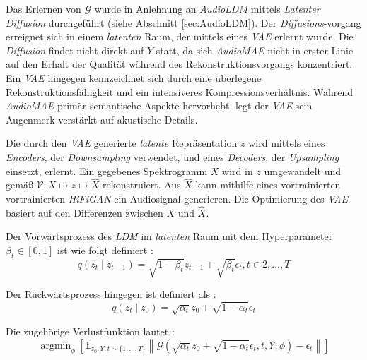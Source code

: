 \documentclass[
  a4paper,  %
  twoside,  %
  bibliography=totoc,
  headsepline,
  cleardoublepage=empty,
  parskip=half,
  draft=false
]{scrbook}
\begin{document}
Das Erlernen von $\mathcal{G}$ wurde in Anlehnung an \emph{AudioLDM} \cite{liu_audioldm_2023} mittels \emph{Latenter Diffusion} \cite{rombach_high-resolution_2022} durchgeführt (siehe Abschnitt \ref{sec:AudioLDM}). Der \emph{Diffusions}-vorgang erreignet sich in einem \emph{latenten} Raum, der mittels eines \emph{VAE} \cite{kingma_auto-encoding_2022} erlernt wurde. Die \emph{Diffusion} findet nicht direkt auf $Y$ statt, da sich \emph{AudioMAE} nicht in erster Linie auf den Erhalt der Qualität während des Rekonstruktionsvorgangs konzentriert. Ein \emph{VAE} hingegen kennzeichnet sich durch eine überlegene Rekonstruktionsfähigkeit und ein intensiveres Kompressionsverhältnis. Während \emph{AudioMAE} primär semantische Aspekte hervorhebt, legt der \emph{VAE} sein Augenmerk verstärkt auf akustische Details. \cite{liu_audioldm2_2023}

Die durch den \emph{VAE} generierte \emph{latente} Repräsentation $z$ wird mittels eines \emph{Encoders}, der \emph{Downsampling} verwendet, und eines \emph{Decoders}, der \emph{Upsampling} einsetzt, erlernt. Ein gegebenes Spektrogramm $X$ wird in $z$ umgewandelt und gemäß $\mathcal{V}: X \mapsto z \mapsto \hat{X}$ rekonstruiert. Aus $\hat{X}$ kann mithilfe eines vortrainierten vortrainierten \emph{HiFiGAN} \cite{kong_hifi-gan_2020} ein Audiosignal generieren. Die Optimierung des \emph{VAE} basiert auf den Differenzen zwischen $X$ und $\hat{X}$. \cite{liu_audioldm2_2023}

Der Vorwärtsprozess des \emph{LDM} im \emph{latenten} Raum mit dem Hyperparameter $\beta_t \in[0,1]$ ist wie folgt definiert \cite{liu_audioldm2_2023}:
\begin{equation}
    q\left(z_t \mid z_{t-1}\right)=\sqrt{1-\beta_t} z_{t-1}+\sqrt{\beta_t} \epsilon_t, t \in 2, \ldots, T
\end{equation}

Der Rückwärtsprozess hingegen ist definiert als \cite{liu_audioldm2_2023}:
\begin{equation}
q\left(z_t \mid z_0\right)=\sqrt{\alpha_t} z_0+\sqrt{1-\alpha_t} \epsilon_t
\end{equation}

Die zugehörige Verlustfunktion lautet \cite{liu_audioldm2_2023}:
\begin{equation}
\operatorname{argmin}_\phi\left[\mathbb{E}_{z_0, Y, t \sim\{1, \ldots, T\}}\left\|\mathcal{G}\left(\sqrt{\alpha_t} z_0+\sqrt{1-\alpha_t} \epsilon_t, t, Y ; \phi\right)-\epsilon_t\right\|\right]
\end{equation}
\end{document}
